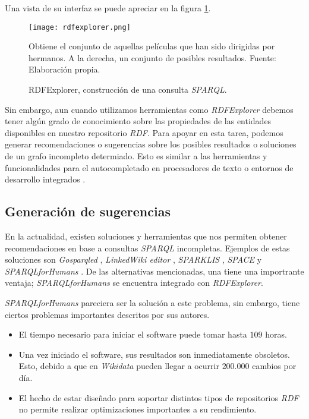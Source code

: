 Una vista de su interfaz se puede apreciar en la figura \ref{fig:rdfexplorer}.

\begin{figure}
    \centering
    \texttt{[image: rdfexplorer.png]}
    \caption{RDFExplorer, construcción de una consulta \textit{SPARQL}.} Obtiene el conjunto de aquellas películas que han sido dirigidas por hermanos. A la derecha, un conjunto de posibles resultados. Fuente: Elaboración propia.
    \label{fig:rdfexplorer}
\end{figure}

Sin embargo, aun cuando utilizamos herramientas como \textit{RDFExplorer} debemos tener algún grado de conocimiento sobre las propiedades de las entidades disponibles en nuestro repositorio \textit{RDF}. Para apoyar en esta tarea, podemos generar recomendaciones o sugerencias sobre los posibles resultados o soluciones de un grafo incompleto determiado. Esto es similar a las herramientas y funcionalidades para el autocompletado en procesadores de texto o entornos de desarrollo integrados \cite{bruch2009learning}.

\subsection{Generación de sugerencias}

En la actualidad, existen soluciones y herramientas que nos permiten obtener recomendaciones en base a consultas \textit{SPARQL} incompletas. Ejemplos de estas soluciones son \textit{Gosparqled} \cite{campinas2014live}, \textit{LinkedWiki editor} \cite{rafes2018designing}, \textit{SPARKLIS} \cite{ferre2017sparklis}, \textit{SPACE} \cite{kramer2013space} y \textit{SPARQLforHumans} \cite{parra2020autocompletion}. De las alternativas mencionadas, una tiene una importrante ventaja; \textit{SPARQLforHumans} se encuentra integrado con \textit{RDFExplorer}.

\textit{SPARQLforHumans} pareciera ser la solución a este problema, sin embargo, tiene ciertos problemas importantes descritos por sus autores.

\begin{itemize}
    \item El tiempo necesario para iniciar el software puede tomar hasta $109$ horas.
    \item Una vez iniciado el software, sus resultados son inmediatamente obsoletos. Esto, debido a que en \textit{Wikidata} pueden llegar a ocurrir $200.000$ cambios por día.
    \item El hecho de estar diseñado para soportar distintos tipos de repositorios \textit{RDF} no permite realizar optimizaciones importantes a su rendimiento.
\end{itemize}

